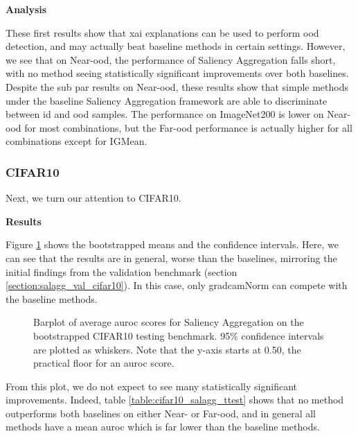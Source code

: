 \documentclass[UKenglish]{uiomasterthesis} %
\theoremstyle{definition}
\begin{document}
\noindent \textbf{Analysis}

\noindent These first results show that \ac{xai} explanations can be used to perform \ac{ood} detection, and may actually beat baseline methods in certain settings. However, we see that on Near-\ac{ood}, the performance of Saliency Aggregation falls short, with no method seeing statistically significant improvements over both baselines. Despite the sub par results on Near-\ac{ood}, these results show that simple methods under the baseline Saliency Aggregation framework are able to discriminate between \ac{id} and \ac{ood} samples. The performance on ImageNet200 is lower on Near-\ac{ood} for most combinations, but the Far-\ac{ood} performance is actually higher for all combinations except for IGMean.

\subsubsection{CIFAR10}

Next, we turn our attention to CIFAR10.

\noindent \textbf{Results}

\noindent Figure \ref{fig:cifar10_salagg_bootstrap_barplot} shows the bootstrapped means and the confidence intervals. Here, we can see that the results are in general, worse than the baselines, mirroring the initial findings from the validation benchmark (section \ref{section:salagg_val_cifar10}). In this case, only \ac{gradcam}Norm can compete with the baseline methods.

\begin{figure}[H]
    \begin{center}
        
    \end{center}
    \caption[CIFAR10 Saliency Aggregation Bootstrap]{Barplot of average \ac{auroc} scores for Saliency Aggregation on the bootstrapped CIFAR10 testing benchmark. 95\% confidence intervals are plotted as whiskers. Note that the y-axis starts at 0.50, the practical floor for an \ac{auroc} score.}
    \label{fig:cifar10_salagg_bootstrap_barplot}
\end{figure}

From this plot, we do not expect to see many statistically significant improvements. Indeed, table \ref{table:cifar10_salagg_ttest} shows that no method outperforms both baselines on either Near- or Far-\ac{ood}, and in general all methods have a mean \ac{auroc} which is far lower than the baseline methods.
\end{document}
